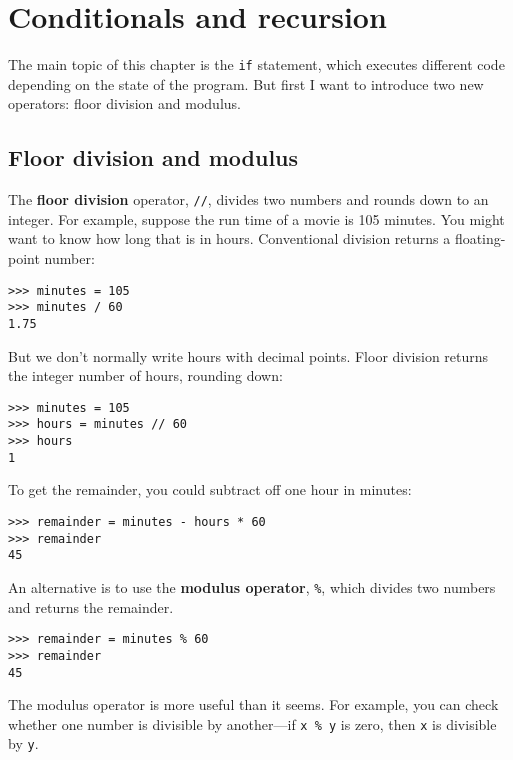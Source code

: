 \chapter{Conditionals and recursion}

The main topic of this chapter is the {\tt if} statement, which
executes different code depending on the state of the program.
But first I want to introduce two new operators: floor division
and modulus.


\section{Floor division and modulus}

The {\bf floor division} operator, \verb"//", divides
two numbers and rounds down to an integer.  For example, suppose the
run time of a movie is 105 minutes.  You might want to know how
long that is in hours.  Conventional division
returns a floating-point number:

\begin{verbatim}
>>> minutes = 105
>>> minutes / 60
1.75
\end{verbatim}

But we don't normally write hours with decimal points.  Floor
division returns the integer number of hours, rounding down:

\begin{verbatim}
>>> minutes = 105
>>> hours = minutes // 60
>>> hours
1
\end{verbatim}

To get the remainder, you could subtract off one hour in minutes:

\begin{verbatim}
>>> remainder = minutes - hours * 60
>>> remainder
45
\end{verbatim}


An alternative is to use the {\bf modulus operator}, \verb"%", which
divides two numbers and returns the remainder.

\begin{verbatim}
>>> remainder = minutes % 60
>>> remainder
45
\end{verbatim}
%
The modulus operator is more useful than it seems.  For
example, you can check whether one number is divisible by another---if
{\tt x \% y} is zero, then {\tt x} is divisible by {\tt y}.

